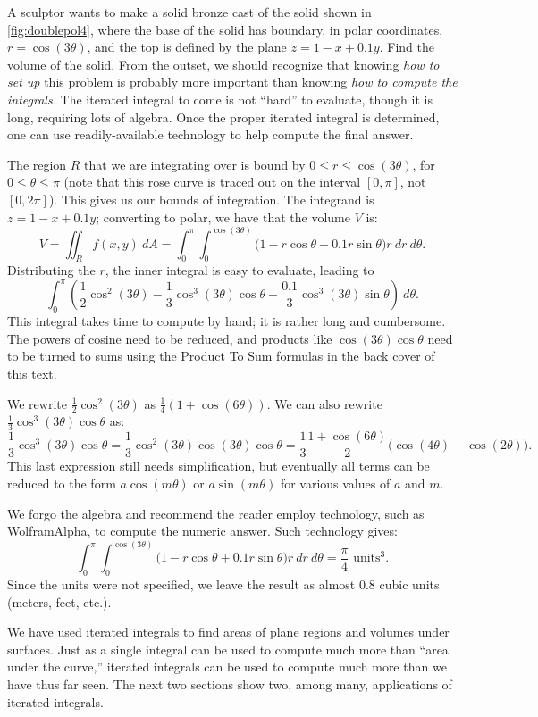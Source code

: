 \begin{example}\label{ex_doublepol4}
A sculptor wants to make a solid bronze cast of the solid shown in \autoref{fig:doublepol4}, where the base of the solid has boundary, in polar coordinates, $r=\cos(3\theta)$, and the top is defined by the plane $z=1-x+0.1y$. Find the volume of the solid.
\solution
From the outset, we should recognize that knowing \emph{how to set up} this problem is probably more important than knowing \emph{how to compute the integrals.} The iterated integral to come is not ``hard'' to evaluate, though it is long, requiring lots of algebra. Once the proper iterated integral is determined, one can use readily-available technology to help compute the final answer. 

The region $R$ that we are integrating over is bound by $0\leq r\leq \cos(3\theta)$, for $0\leq \theta\leq\pi$ (note that this rose curve is traced out on the interval $[0,\pi]$, not $[0,2\pi]$). This gives us our bounds of integration. The integrand is $z=1-x+0.1y$; converting to polar, we have that the volume $V$ is:
\[V = \iint_R f(x,y)\ dA = \int_0^\pi\int_0^{\cos(3\theta)}\bigl(1-r\cos\theta+0.1r\sin\theta\bigr)r\ dr\ d\theta.\]
Distributing the $r$, the inner integral is easy to evaluate, leading to 
\[ \int_0^\pi \left(\frac12\cos^2(3\theta)-\frac13\cos^3(3\theta)\cos\theta
+\frac{0.1}3\cos^3(3\theta)\sin\theta\right)\ d\theta.\]
This integral takes time to compute by hand; it is rather long and cumbersome. The powers of cosine need to be reduced, and products like $\cos(3\theta)\cos\theta$ need to be turned to sums using the Product To Sum formulas in the back cover of this text. 

We rewrite $\frac12\cos^2(3\theta)$ as $\frac14(1+\cos(6\theta))$. We can also rewrite $\frac13\cos^3(3\theta)\cos\theta$ as: 
\[\frac13\cos^3(3\theta)\cos\theta = \frac13\cos^2(3\theta)\cos(3\theta)\cos\theta = \frac13\frac{1+\cos(6\theta)}2\bigl(\cos(4\theta)+\cos(2\theta)\bigr).\]
This last expression still needs simplification, but eventually all terms can be reduced to the form $a\cos(m\theta)$ or $a\sin(m\theta)$ for various values of $a$ and $m$.

We forgo the algebra and recommend the reader employ technology, such as WolframAlpha\textregistered, to compute the numeric answer. Such technology gives:
\[\int_0^\pi\int_0^{\cos(3\theta)}\bigl(1-r\cos\theta+0.1r\sin\theta\bigr)r\ dr\ d\theta = \frac{\pi}{4} %
\text{ units}^3.\]
Since the units were not specified, we leave the result as almost $0.8$ cubic units (meters, feet, etc.).%
\end{example}

We have used iterated integrals to find areas of plane regions and volumes under surfaces. Just as a single integral can be used to compute much more than ``area under the curve,'' iterated integrals can be used to compute much more than we have thus far seen. The next two sections show two, among many, applications of iterated integrals.

